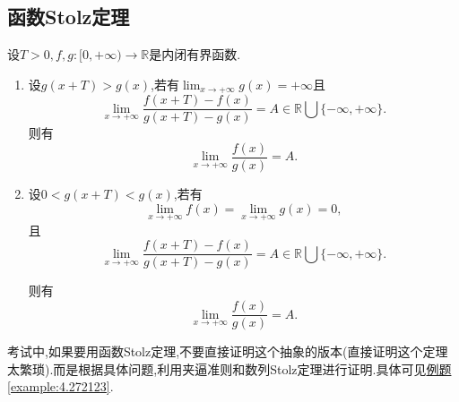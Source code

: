 \documentclass[../../main.tex]{subfiles}
\begin{document}
\subsection{函数Stolz定理}

\begin{theorem}[函数Stolz定理]\label{theorem:函数Stolz定理}
设\(T > 0,f,g:[0,+\infty)\to\mathbb{R}\)是内闭有界函数.
\begin{enumerate}[(1)]
\item 设\(g(x + T)>g(x)\),若有\(\lim_{x\rightarrow +\infty}g(x)=+\infty\)且
\[
\lim_{x\rightarrow +\infty}\frac{f(x + T)-f(x)}{g(x + T)-g(x)}=A\in\mathbb{R}\bigcup\{-\infty,+\infty\}.
\]
则有
\[
\lim_{x\rightarrow +\infty}\frac{f(x)}{g(x)}=A.
\]

\item 设\(0 < g(x + T)<g(x)\),若有
\[
\lim_{x\rightarrow +\infty}f(x)=\lim_{x\rightarrow +\infty}g(x)=0,
\]
且
\[
\lim_{x\rightarrow +\infty}\frac{f(x + T)-f(x)}{g(x + T)-g(x)}=A\in\mathbb{R}\bigcup\{-\infty,+\infty\}.
\]

则有
\[
\lim_{x\rightarrow +\infty}\frac{f(x)}{g(x)}=A.
\]
\end{enumerate}
\end{theorem}
\begin{remark}
考试中,如果要用函数Stolz定理,不要直接证明这个抽象的版本(直接证明这个定理太繁琐).而是根据具体问题,利用夹逼准则和数列Stolz定理进行证明.具体可见\hyperref[example:4.272123]{例题\ref{example:4.272123}}.
\end{remark}
\end{document}

